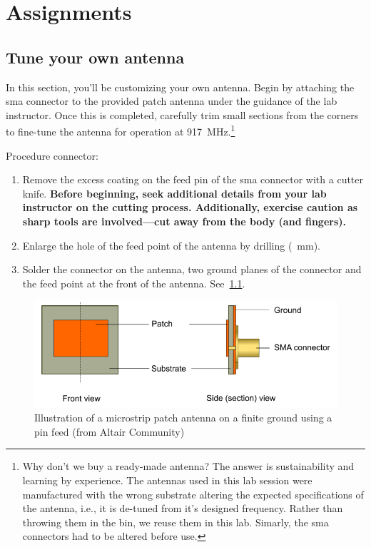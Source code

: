 \chapter{Assignments}\label{ch:assignments}

\section{Tune your own antenna}
In this section, you'll be customizing your own antenna. Begin by attaching the \gls{sma} connector to the provided patch antenna under the guidance of the lab instructor. Once this is completed, carefully trim small sections from the corners to fine-tune the antenna for operation at \SI{917}{\mega\hertz}.\footnote{Why don't we buy a ready-made antenna? The answer is sustainability and learning by experience. The antennas used in this lab session were manufactured with the wrong substrate altering the expected specifications of the antenna, i.e., it is de-tuned from it's designed frequency. Rather than throwing them in the bin, we reuse them in this lab. Simarly, the \gls{sma} connectors had to be altered before use.}

Procedure connector:
\begin{enumerate}
    \item Remove the excess coating on the feed pin of the \gls{sma} connector with a cutter knife. \textbf{Before beginning, seek additional details from your lab instructor on the cutting process. Additionally, exercise caution as sharp tools are involved—cut away from the body (and fingers).}
    \item Enlarge the hole of the feed point of the antenna by drilling (\SI{}{mm}).
    \item Solder the connector on the antenna, two ground planes of the connector and the feed point at the front of the antenna. See~\cref{fig:patch}.
\end{enumerate}

\begin{figure}[hbtp]
    \centering
    \includegraphics[width=0.8\linewidth]{figs/patch_microstrip_pin_fed.png}
    \caption{Illustration of a microstrip patch antenna on a finite ground using a pin feed (from Altair Community)}\label{fig:patch}
\end{figure}

